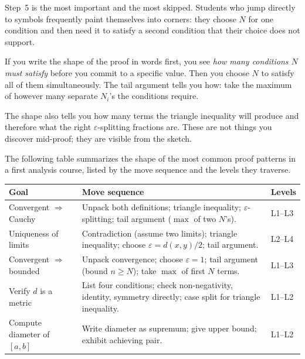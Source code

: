 \begin{remark}
Step~5 is the most important and the most skipped. Students who jump
directly to symbols frequently paint themselves into corners: they
choose $N$ for one condition and then need it to satisfy a second
condition that their choice does not support.

If you write the shape of the proof in words first, you see
\emph{how many conditions $N$ must satisfy} before you commit to a
specific value. Then you choose $N$ to satisfy all of them simultaneously.
The tail argument tells you how: take the maximum of however many
separate $N_i$'s the conditions require.

The shape also tells you how many terms the triangle inequality will
produce and therefore what the right $\varepsilon$-splitting fractions
are. These are not things you discover mid-proof; they are visible from
the sketch.
\end{remark}

\begin{remark}
The following table summarizes the shape of the most common proof
patterns in a first analysis course, listed by the move sequence
and the levels they traverse.

\medskip
\begin{center}
\renewcommand{\arraystretch}{1.4}
\small
\begin{tabular}{p{} p{} p{}}
\toprule
\textbf{Goal} & \textbf{Move sequence} & \textbf{Levels} \\
\midrule
Convergent $\Rightarrow$ Cauchy &
  Unpack both definitions; triangle inequality; $\varepsilon$-splitting;
  tail argument ($\max$ of two $N$'s). & L1--L3 \\
Uniqueness of limits &
  Contradiction (assume two limits); triangle inequality; choose
  $\varepsilon = d(x,y)/2$; tail argument. & L2--L4 \\
Convergent $\Rightarrow$ bounded &
  Unpack convergence; choose $\varepsilon = 1$; tail argument
  (bound $n \geq N$); take $\max$ of first $N$ terms. & L1--L3 \\
Verify $d$ is a metric &
  List four conditions; check non-negativity, identity, symmetry directly;
  case split for triangle inequality. & L1--L2 \\
Compute diameter of $[a,b]$ &
  Write diameter as supremum; give upper bound; exhibit achieving pair. & L1--L2 \\
\bottomrule
\end{tabular}
\end{center}
\end{remark}

